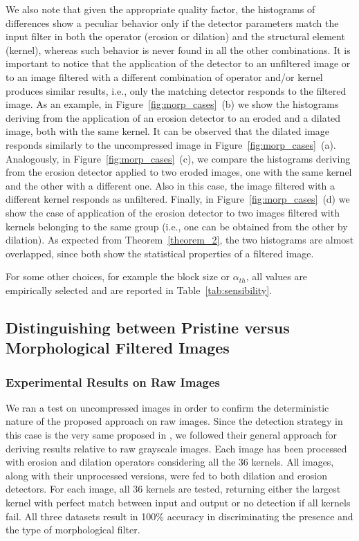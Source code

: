 \documentclass{ieeeaccess}
\begin{document}
We also note that given the appropriate quality factor, the histograms of differences show a peculiar behavior only if the detector parameters match the input filter in both the operator (erosion or dilation) and the structural element (kernel), whereas such behavior is never found in all the other combinations. It is important to notice that the application of the detector to an unfiltered image or to an image filtered with a different combination of operator and/or kernel produces similar results, i.e., only the matching detector responds to the filtered image. As an example, in Figure~\ref{fig:morp_cases}~(b) we show the histograms deriving from the application of an erosion detector to an eroded and a dilated image, both with the same kernel. It can be observed that the dilated image responds similarly to the uncompressed image in Figure~\ref{fig:morp_cases}~(a). Analogously, in Figure~\ref{fig:morp_cases}~(c), we compare the histograms deriving from the erosion detector applied to two eroded images, one with the same kernel and the other with a different one. Also in this case, the image filtered with a different kernel responds as unfiltered. Finally, in Figure~\ref{fig:morp_cases}~(d) we show the case of application of the erosion detector to two images filtered with kernels belonging to the same group (i.e., one can be obtained from the other by dilation). As expected from Theorem~\ref{theorem_2}, the two histograms are almost overlapped, since both show the statistical properties of a filtered image.

For some other choices, for example the block size or $\alpha_{th}$, all values are empirically selected and are reported in Table~\ref{tab:sensibility}. 

\subsection{Distinguishing between Pristine versus Morphological Filtered Images}
\label{sec:compr_res}

\subsubsection{Experimental Results on Raw Images}
We ran a test on uncompressed images in order to confirm the deterministic nature of the proposed approach on raw images. Since the detection strategy in this case is the very same proposed in \cite{de2017detecting}, we followed their general approach for deriving results relative to raw grayscale images. Each image has been processed with erosion and dilation operators considering all the 36 kernels.
All images, along with their unprocessed versions, were fed to both dilation and erosion detectors. For each image, all 36 kernels are tested, returning either the largest kernel with perfect match between input and output or no detection if all kernels fail. All three datasets result in 100\% accuracy in discriminating the presence and the type of morphological filter.%
\end{document}
